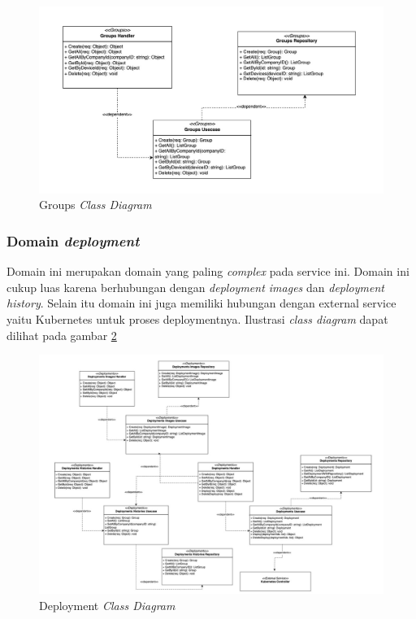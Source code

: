 \begin{figure}[ht]
  \centering
  \includegraphics[width=1\textwidth]{resources/chapter-3/class/groups-class-diagram.jpg}
  \caption{Groups \textit{Class Diagram}}
  \label{fig:groups-class-diagram}
\end{figure}

\subsubsection{Domain \textit{deployment}}

Domain ini merupakan domain yang paling \textit{complex} pada service ini. Domain ini cukup luas karena berhubungan dengan \textit{deployment images} dan \textit{deployment history}. Selain itu domain ini juga memiliki hubungan dengan external service yaitu Kubernetes untuk proses deploymentnya. Ilustrasi \textit{class diagram} dapat dilihat pada gambar \ref{fig:deployment-class-diagram}

\begin{figure}[ht]
  \centering
  \includegraphics[width=1\textwidth]{resources/chapter-3/class/deployment-class-diagram.jpg}
  \caption{Deployment \textit{Class Diagram}}
  \label{fig:deployment-class-diagram}
\end{figure}


